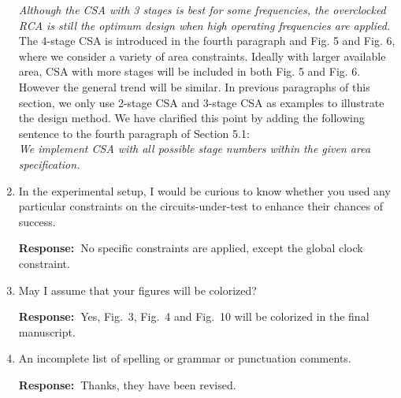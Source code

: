 \documentclass[a4paper, 11pt]{article}
\def\Response{\noindent \textbf{Response:~}}
\newcommand{\Question}[1]{\textcolor[rgb]{0.51,0.00,0.00}{#1}}
\newcommand{\PaperText}[1]{\emph{#1}}
\begin{document}
\begin{enumerate}
      \PaperText{Although the CSA with 3 stages is best for some frequencies, the overclocked RCA is still the optimum design when high operating frequencies are applied.}\\
      
      The 4-stage CSA is introduced in the fourth paragraph and Fig. 5 and Fig. 6, where we consider a variety of area constraints. Ideally with larger available area, CSA with more stages will be included in both Fig. 5 and Fig. 6. However the general trend will be similar. In previous paragraphs of this section, we only use 2-stage CSA and 3-stage CSA as examples to illustrate the design method. We have clarified this point by adding the following sentence to the fourth paragraph of Section 5.1:\\
      
      \PaperText{We implement CSA with all possible stage numbers within the given area specification.}\\
      
  \item \Question{In the experimental setup, I would be curious to know whether you used any particular constraints on the circuits-under-test to enhance their chances of success.}
      
      \Response  No specific constraints are applied, except the global clock constraint.\\
      
  \item \Question{May I assume that your figures will be colorized?}
        
      \Response Yes, Fig.~3, Fig.~4 and Fig.~10 will be colorized in the final manuscript.\\
      
  \item \Question{An incomplete list of spelling or grammar or punctuation comments.}
      
      \Response Thanks, they have been revised.

      

\end{enumerate}
\end{document}

